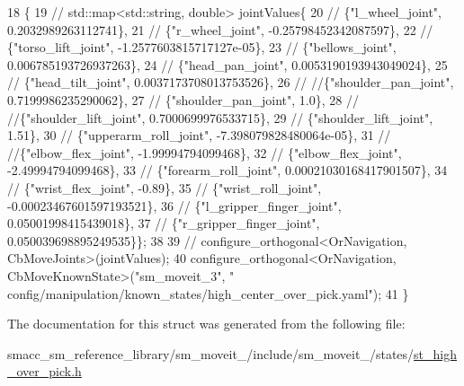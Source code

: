\begin{DoxyCode}
18     \{
19         \textcolor{comment}{// std::map<std::string, double> jointValues\{}
20         \textcolor{comment}{//     \{"l\_wheel\_joint", 0.2032989263112741\},}
21         \textcolor{comment}{//     \{"r\_wheel\_joint", -0.25798452342087597\},}
22         \textcolor{comment}{//     \{"torso\_lift\_joint", -1.2577603815717127e-05\},}
23         \textcolor{comment}{//     \{"bellows\_joint", 0.006785193726937263\},}
24         \textcolor{comment}{//     \{"head\_pan\_joint", 0.0053190193943049024\},}
25         \textcolor{comment}{//     \{"head\_tilt\_joint", 0.0037173708013753526\},}
26         \textcolor{comment}{//     //\{"shoulder\_pan\_joint", 0.7199986235290062\},}
27         \textcolor{comment}{//     \{"shoulder\_pan\_joint", 1.0\},}
28         \textcolor{comment}{//     //\{"shoulder\_lift\_joint", 0.7000699976533715\},}
29         \textcolor{comment}{//     \{"shoulder\_lift\_joint", 1.51\},}
30         \textcolor{comment}{//     \{"upperarm\_roll\_joint", -7.398079828480064e-05\},}
31         \textcolor{comment}{//     //\{"elbow\_flex\_joint", -1.99994794099468\},}
32         \textcolor{comment}{//     \{"elbow\_flex\_joint", -2.49994794099468\},}
33         \textcolor{comment}{//     \{"forearm\_roll\_joint", 0.00021030168417901507\},}
34         \textcolor{comment}{//     \{"wrist\_flex\_joint", -0.89\},}
35         \textcolor{comment}{//     \{"wrist\_roll\_joint", -0.00023467601597193521\},}
36         \textcolor{comment}{//     \{"l\_gripper\_finger\_joint", 0.05001998415439018\},}
37         \textcolor{comment}{//     \{"r\_gripper\_finger\_joint", 0.050039698895249535\}\};}
38 
39       \textcolor{comment}{//  configure\_orthogonal<OrNavigation, CbMoveJoints>(jointValues);}
40         configure\_orthogonal<OrNavigation, CbMoveKnownState>(\textcolor{stringliteral}{"sm\_moveit\_3"}, \textcolor{stringliteral}{"
      config/manipulation/known\_states/high\_center\_over\_pick.yaml"});
41     \}
\end{DoxyCode}


The documentation for this struct was generated from the following file\+:\begin{DoxyCompactItemize}
\item 
smacc\+\_\+sm\+\_\+reference\+\_\+library/sm\+\_\+moveit\+\_/include/sm\+\_\+moveit\+\_/states/\hyperlink{st__high__over__pick_8h}{st\+\_\+high\+\_\+over\+\_\+pick.\+h}\end{DoxyCompactItemize}
